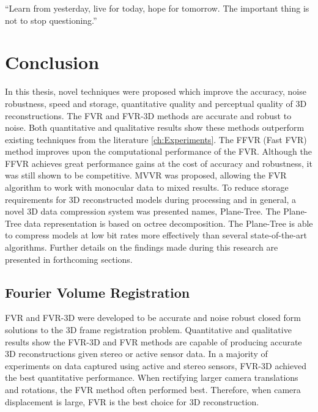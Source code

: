 \begin{savequote}[8cm]
  ``Learn from yesterday, live for today, hope for tomorrow. The important thing is not to stop questioning.''
\end{savequote}
\makeatletter
\chapter{Conclusion}
\label{ch:Conclusion}

In this thesis, novel techniques were proposed which improve the accuracy, noise robustness, speed and storage, quantitative quality and perceptual quality of 3D reconstructions. The FVR and FVR-3D methods are accurate and robust to noise. Both quantitative and qualitative results show these methods outperform existing techniques from the literature \ref{ch:Experiments}. The FFVR (Fast FVR) method improves upon the computational performance of the FVR. Although the FFVR achieves great performance gains at the cost of accuracy and robustness, it was still shown to be competitive. MVVR was proposed, allowing the FVR algorithm to work with monocular data to mixed results. To reduce storage requirements for 3D reconstructed models during processing and in general, a novel 3D data compression system was presented names, Plane-Tree. The Plane-Tree data representation is based on octree decomposition. The Plane-Tree is able to compress models at low bit rates more effectively than several state-of-the-art algorithms. Further details on the findings made during this research are presented in forthcoming sections. \\

\section{Fourier Volume Registration}
\label{Sec:ConcFVR}

FVR and FVR-3D were developed to be accurate and noise robust closed form solutions to the 3D frame registration problem. Quantitative and qualitative results show the FVR-3D and FVR methods are capable of producing accurate 3D reconstructions given stereo or active sensor data. In a majority of experiments on data captured using active and stereo sensors, FVR-3D achieved the best quantitative performance.  When rectifying larger camera translations and rotations, the FVR method often performed best. Therefore, when camera displacement is large, FVR is the best choice for 3D reconstruction. \\

